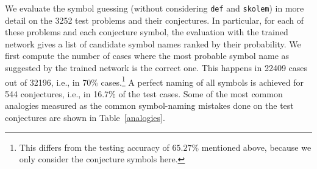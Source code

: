 \documentclass{ecai}
\newcommand{\nbc}[3]{
                {\colorbox{#3}{\bfseries\sffamily\scriptsize\textcolor{white}{#1}}}
                {\textcolor{#3}{\sffamily\small$\blacktriangleright$\textit{#2}$\blacktriangleleft$}}
}
\newcommand{\todoat}[2]{\nbc{TODO: #1}{#2}{todocolor}}
\begin{document}
We evaluate the symbol
guessing (without considering  \texttt{def} and \texttt{skolem}) in more detail on the 3252 test problems and their conjectures.
In particular, for each of these problems and each conjecture symbol,
the evaluation with the trained network gives a list of candidate
symbol names ranked by their probability.  We first compute the number
of cases where the most probable symbol name as suggested by the
trained network is the correct one.  This happens in 22409 cases out
of 32196, i.e., in 70\% cases.\footnote{This differs from the
  testing accuracy of $65.27\%$
  mentioned above, because we only consider the conjecture symbols here.}
A perfect naming of all symbols is achieved for 544 conjectures, i.e.,
in 16.7\% of the test cases. Some of the most common analogies
measured as the common symbol-naming mistakes done on the test
conjectures are shown in Table~\ref{analogies}.
\end{document}
